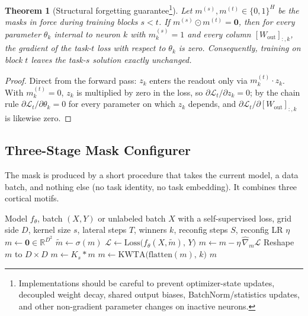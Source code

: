 \documentclass{article}
\newtheorem{theorem}{Theorem}
\begin{document}
\begin{theorem}[Structural forgetting guarantee\footnote{Implementations should be careful to prevent optimizer-state updates, decoupled weight decay, shared output biases, BatchNorm/statistics updates, and other non-gradient parameter changes on inactive neurons.}]
\label{thm:isolation}
Let $m^{(s)}, m^{(t)} \in \{0,1\}^H$ be the masks in force during training blocks $s < t$. If $m^{(s)} \odot m^{(t)} = \mathbf{0}$, then for every parameter $\theta_k$ internal to neuron $k$ with $m^{(s)}_k = 1$ and every column $[W_\mathrm{out}]_{:,k}$, the gradient of the task-$t$ loss with respect to $\theta_k$ is zero. Consequently, training on block $t$ leaves the task-$s$ solution exactly unchanged.
\end{theorem}

\begin{proof}
Direct from the forward pass: $z_k$ enters the readout only via $m^{(t)}_k \cdot z_k$. With $m^{(t)}_k = 0$, $z_k$ is multiplied by zero in the loss, so $\partial \mathcal{L}_t / \partial z_k = 0$; by the chain rule $\partial \mathcal{L}_t / \partial \theta_k = 0$ for every parameter on which $z_k$ depends, and $\partial \mathcal{L}_t / \partial [W_\mathrm{out}]_{:,k}$ is likewise zero.
\end{proof}

\subsection{Three-Stage Mask Configurer}
\label{sec:mask_config}

The mask is produced by a short procedure that takes the current model, a data batch, and nothing else (no task identity, no task embedding). It combines three cortical motifs.

\begin{algorithm}[t]
\caption{\textsc{SmoothKWTA} mask configurer}
\label{alg:mask_config}
\begin{algorithmic}[1]
\REQUIRE Model $f_\theta$, batch $(X,Y)$ or unlabeled batch $X$ with a self-supervised loss, grid side $D$, kernel size $s$, lateral steps $T$, winners $k$, reconfig steps $S$, reconfig LR $\eta$
\STATE $m \leftarrow \mathbf{0} \in \mathbb{R}^{D^2}$ 
  \STATE $\tilde{m} \leftarrow \sigma(m)$
  \STATE $\mathcal{L} \leftarrow \mathrm{Loss}\bigl(f_\theta(X, \tilde{m}),\, Y\bigr)$
  \STATE $m \leftarrow m - \eta\,\widehat{\nabla}_m \mathcal{L}$ 
\ENDFOR
\STATE Reshape $m$ to $D\times D$
  \STATE $m \leftarrow K_s * m$ 
\ENDFOR
\STATE $m \leftarrow \mathrm{KWTA}\bigl(\mathrm{flatten}(m),\, k\bigr)$
\RETURN $m$
\end{algorithmic}
\end{algorithm}
\end{document}
